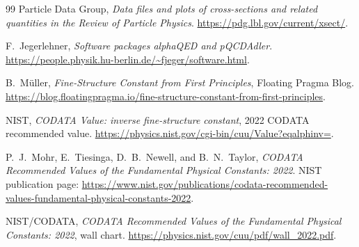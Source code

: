 \documentclass[11pt]{article}
\theoremstyle{remark}
\begin{document}
\begin{thebibliography}{99}
Particle Data Group,
\emph{Data files and plots of cross-sections and related quantities in the Review of Particle Physics}.
\url{https://pdg.lbl.gov/current/xsect/}.

F.\ Jegerlehner,
\emph{Software packages alphaQED and pQCDAdler}.
\url{https://people.physik.hu-berlin.de/~fjeger/software.html}.

B.\ M\"uller,
\emph{Fine-Structure Constant from First Principles},
Floating Pragma Blog.
\url{https://blog.floatingpragma.io/fine-structure-constant-from-first-principles}.

NIST,
\emph{CODATA Value: inverse fine-structure constant},
2022 CODATA recommended value.
\url{https://physics.nist.gov/cgi-bin/cuu/Value?eqalphinv=}.

P.\ J.\ Mohr, E.\ Tiesinga, D.\ B.\ Newell, and B.\ N.\ Taylor,
\emph{CODATA Recommended Values of the Fundamental Physical Constants: 2022}.
NIST publication page:
\url{https://www.nist.gov/publications/codata-recommended-values-fundamental-physical-constants-2022}.

NIST/CODATA,
\emph{CODATA Recommended Values of the Fundamental Physical Constants: 2022},
wall chart.
\url{https://physics.nist.gov/cuu/pdf/wall_2022.pdf}.

\end{thebibliography}
\end{document}
